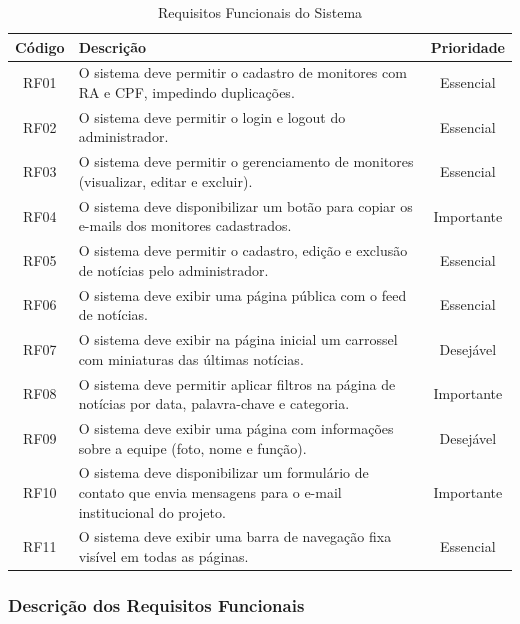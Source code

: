 \documentclass[a4paper,12pt]{article}
\begin{document}
\begin{table}[H]
\centering
\label{tab:req-funcionais}
\begin{tabularx}{\textwidth}{|c|X|c|}
    \hline
    \textbf{Código} & \textbf{Descrição} & \textbf{Prioridade} \\
    \hline
    RF01 & O sistema deve permitir o cadastro de monitores com RA e CPF, impedindo duplicações. & Essencial \\
    \hline
    RF02 & O sistema deve permitir o login e logout do administrador. & Essencial \\
    \hline
    RF03 & O sistema deve permitir o gerenciamento de monitores (visualizar, editar e excluir). & Essencial \\
    \hline
    RF04 & O sistema deve disponibilizar um botão para copiar os e-mails dos monitores cadastrados. & Importante \\
    \hline
    RF05 & O sistema deve permitir o cadastro, edição e exclusão de notícias pelo administrador. & Essencial \\
    \hline
    RF06 & O sistema deve exibir uma página pública com o feed de notícias. & Essencial \\
    \hline
    RF07 & O sistema deve exibir na página inicial um carrossel com miniaturas das últimas notícias. & Desejável \\
    \hline
    RF08 & O sistema deve permitir aplicar filtros na página de notícias por data, palavra-chave e categoria. & Importante \\
    \hline
    RF09 & O sistema deve exibir uma página com informações sobre a equipe (foto, nome e função). & Desejável \\
    \hline
    RF10 & O sistema deve disponibilizar um formulário de contato que envia mensagens para o e-mail institucional do projeto. & Importante \\
    \hline
    RF11 & O sistema deve exibir uma barra de navegação fixa visível em todas as páginas. & Essencial \\
    \hline
\end{tabularx}
\caption{Requisitos Funcionais do Sistema}
\end{table}


\subsubsection*{Descrição dos Requisitos Funcionais}
\end{document}
